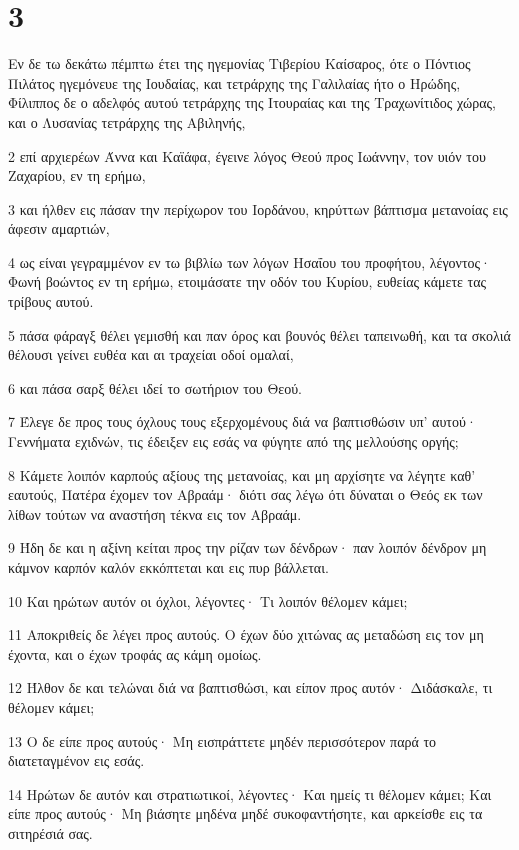 \chapter{3}

\par Εν δε τω δεκάτω πέμπτω έτει της ηγεμονίας Τιβερίου Καίσαρος, ότε ο Πόντιος Πιλάτος ηγεμόνευε της Ιουδαίας, και τετράρχης της Γαλιλαίας ήτο ο Ηρώδης, Φίλιππος δε ο αδελφός αυτού τετράρχης της Ιτουραίας και της Τραχωνίτιδος χώρας, και ο Λυσανίας τετράρχης της Αβιληνής,
\par 2 επί αρχιερέων Άννα και Καϊάφα, έγεινε λόγος Θεού προς Ιωάννην, τον υιόν του Ζαχαρίου, εν τη ερήμω,
\par 3 και ήλθεν εις πάσαν την περίχωρον του Ιορδάνου, κηρύττων βάπτισμα μετανοίας εις άφεσιν αμαρτιών,
\par 4 ως είναι γεγραμμένον εν τω βιβλίω των λόγων Ησαΐου του προφήτου, λέγοντος· Φωνή βοώντος εν τη ερήμω, ετοιμάσατε την οδόν του Κυρίου, ευθείας κάμετε τας τρίβους αυτού.
\par 5 πάσα φάραγξ θέλει γεμισθή και παν όρος και βουνός θέλει ταπεινωθή, και τα σκολιά θέλουσι γείνει ευθέα και αι τραχείαι οδοί ομαλαί,
\par 6 και πάσα σαρξ θέλει ιδεί το σωτήριον του Θεού.
\par 7 Έλεγε δε προς τους όχλους τους εξερχομένους διά να βαπτισθώσιν υπ' αυτού· Γεννήματα εχιδνών, τις έδειξεν εις εσάς να φύγητε από της μελλούσης οργής;
\par 8 Κάμετε λοιπόν καρπούς αξίους της μετανοίας, και μη αρχίσητε να λέγητε καθ' εαυτούς, Πατέρα έχομεν τον Αβραάμ· διότι σας λέγω ότι δύναται ο Θεός εκ των λίθων τούτων να αναστήση τέκνα εις τον Αβραάμ.
\par 9 Ήδη δε και η αξίνη κείται προς την ρίζαν των δένδρων· παν λοιπόν δένδρον μη κάμνον καρπόν καλόν εκκόπτεται και εις πυρ βάλλεται.
\par 10 Και ηρώτων αυτόν οι όχλοι, λέγοντες· Τι λοιπόν θέλομεν κάμει;
\par 11 Αποκριθείς δε λέγει προς αυτούς. Ο έχων δύο χιτώνας ας μεταδώση εις τον μη έχοντα, και ο έχων τροφάς ας κάμη ομοίως.
\par 12 Ήλθον δε και τελώναι διά να βαπτισθώσι, και είπον προς αυτόν· Διδάσκαλε, τι θέλομεν κάμει;
\par 13 Ο δε είπε προς αυτούς· Μη εισπράττετε μηδέν περισσότερον παρά το διατεταγμένον εις εσάς.
\par 14 Ηρώτων δε αυτόν και στρατιωτικοί, λέγοντες· Και ημείς τι θέλομεν κάμει; Και είπε προς αυτούς· Μη βιάσητε μηδένα μηδέ συκοφαντήσητε, και αρκείσθε εις τα σιτηρέσιά σας.
